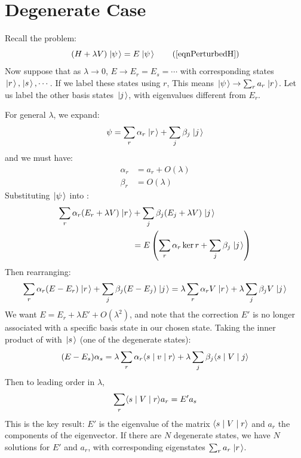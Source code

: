 \documentclass[../Main.tex]{subfiles}
\begin{document}
\section{Degenerate Case}
Recall the problem:
\begin{equation*}
    (H + \lambda V) \state = E\state
    \tag{\ref{eqnPerturbedH}}
\end{equation*}
Now suppose that as $\lambda \to 0$, $E \to E_r = E_s = \cdots$ with corresponding states $\left.\left|r\right.\right\rangle, \left.\left|s\right.\right\rangle, \cdots$. If we label these states using $r$, This means $\left.\left|\psi\right.\right\rangle \to \sum_r a_r \left.\left|r\right.\right\rangle$. Let us label the other basis states $\left.\left|j\right.\right\rangle$, with eigenvalues different from $E_r$.

For general $\lambda$, we expand:
\begin{equation*}
    \psi = \sum_r \alpha_r \left.\left|r\right.\right\rangle + \sum_j \beta_j \left.\left|j\right.\right\rangle
\end{equation*}
and we must have:
\begin{align*}
    \alpha_r &= a_r + O(\lambda) \\
    \beta_r &= O(\lambda)
\end{align*}
Substituting $\left.\left|\psi\right.\right\rangle$ into :
\begin{align*}
    \sum_r \alpha_r (E_r + \lambda V)\left.\left|r\right.\right\rangle &+ \sum_j \beta_j (E_j + \lambda V) \left.\left|j\right.\right\rangle \\
    &= E\left(\sum_r \alpha_r \ker r + \sum_j \beta_j \left.\left|j\right.\right\rangle\right)
\end{align*}
Then rearranging:
\begin{equation}
    \sum_{r} \alpha_r (E - E_r) \left.\left|r\right.\right\rangle + \sum_j \beta_j (E - E_j) \left.\left|j\right.\right\rangle = \lambda \sum_r \alpha_r V \left.\left|r\right.\right\rangle + \lambda \sum_j \beta_j V \left.\left|j\right.\right\rangle
    \label{eqnDegenExpand}
\end{equation}
We want $E = E_r + \lambda E' + O(\lambda^2)$, and note that the correction $E'$ is no longer associated with a specific basis state in our chosen state. Taking the inner product of  with $\left.\left|s\right.\right\rangle$ (one of the degenerate states):
\begin{equation*}
    (E - E_s) \alpha_s = \lambda \sum_r \alpha_r \langle s\mid v\mid r\rangle + \lambda \sum_j \beta_j \langle s\mid V\mid j\rangle
\end{equation*}
Then to leading order in $\lambda$,
\begin{equation}
    \sum_r \langle s\mid V\mid r\rangle a_r = E' a_s
    \label{eqnDegenPerturb}
\end{equation}
This is the key result: $E'$ is the eigenvalue of the matrix $\langle s\mid V\mid r\rangle$ and $a_r$ the components of the eigenvector. If there are $N$ degenerate states, we have $N$ solutions for $E'$ and $a_r$, with corresponding eigenstates $\sum_r a_r \left.\left|r\right.\right\rangle$.
\end{document}
